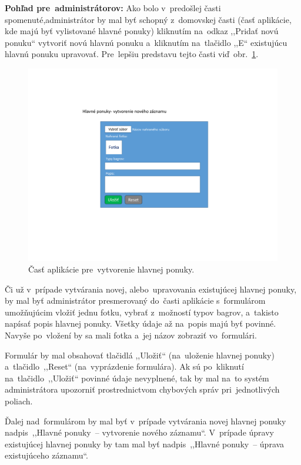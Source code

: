 \textbf{Pohľad pre~administrátorov:} Ako bolo v~predošlej časti spomenuté,\linebreak administrátor by mal byť schopný z~domovskej časti (časť aplikácie, kde majú byť vylistované hlavné ponuky) kliknutím na~odkaz ,,Pridať novú ponuku`` vytvoriť novú hlavnú ponuku a~kliknutím na~tlačidlo ,,E`` existujúcu hlavnú ponuku upravovať. Pre~lepšiu predstavu tejto časti viď~obr.~\ref{main offer form}.

\begin{figure}[H]\centering
\includegraphics[width=140mm]{../img/UI concept/main offer form}
\caption{Časť aplikácie pre~vytvorenie hlavnej ponuky.}
\label{main offer form}
\end{figure}

Či už v~prípade vytvárania novej, alebo~upravovania existujúcej hlavnej ponuky, by mal byť administrátor presmerovaný do~časti aplikácie s~formulárom umožňujúcim vložiť jednu fotku, vybrať z~možností typov bagrov, a~takisto napísať popis hlavnej ponuky. Všetky údaje až na~popis majú byť povinné. Navyše po~vložení by sa mali fotka a~jej názov zobraziť vo~formulári.

Formulár by mal obsahovať tlačidlá ,,Uložiť`` (na~uloženie hlavnej ponuky) a~tlačidlo~,,Reset`` (na~vyprázdenie formulára). Ak sú po~kliknutí na~tlačidlo~,,Uložiť`` povinné údaje nevyplnené, tak by mal na~to systém administrátora upozorniť prostrednictvom chybových správ pri~jednotlivých poliach.

Ďalej nad~formulárom by mal byť v~prípade vytvárania novej hlavnej ponuky nadpis~,,Hlavné ponuky~-- vytvorenie nového záznamu``. V~prípade úpravy existujúcej hlavnej ponuky by tam mal byť nadpis~,,Hlavné ponuky~-- úprava existujúceho záznamu``.

